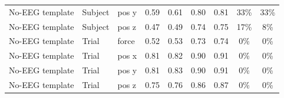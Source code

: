 \begin{table}[t]
\begin{tabular}{lllcccccc}
No-EEG template & Subject & pos y & 0.59 & 0.61 & 0.80 & 0.81 & 33\% & 33\% \\
No-EEG template & Subject & pos z & 0.47 & 0.49 & 0.74 & 0.75 & 17\% & 8\% \\
No-EEG template & Trial & force & 0.52 & 0.53 & 0.73 & 0.74 & 0\% & 0\% \\
No-EEG template & Trial & pos x & 0.81 & 0.82 & 0.90 & 0.91 & 0\% & 0\% \\
No-EEG template & Trial & pos y & 0.81 & 0.83 & 0.90 & 0.91 & 0\% & 0\% \\
No-EEG template & Trial & pos z & 0.75 & 0.76 & 0.86 & 0.87 & 0\% & 0\% \\
\bottomrule
\end{tabular}
\end{table}
